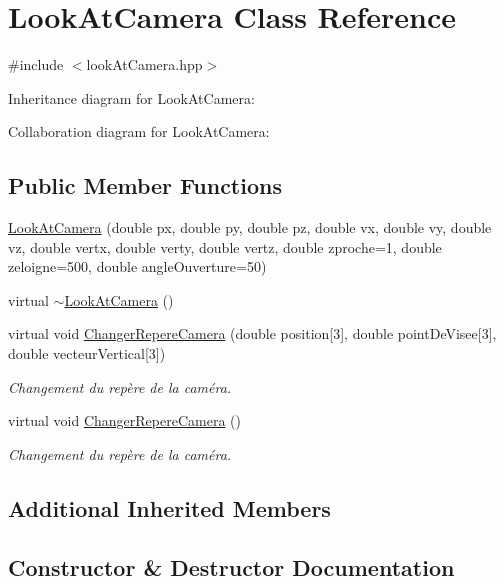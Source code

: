 \hypertarget{class_look_at_camera}{}\section{Look\+At\+Camera Class Reference}
\label{class_look_at_camera}


{\ttfamily \#include $<$look\+At\+Camera.\+hpp$>$}



Inheritance diagram for Look\+At\+Camera\+:


Collaboration diagram for Look\+At\+Camera\+:
\subsection*{Public Member Functions}
\begin{DoxyCompactItemize}
\item 
\hyperlink{class_look_at_camera_a14d523ff4ea3cc37abf726e2ffd981ec}{Look\+At\+Camera} (double px, double py, double pz, double vx, double vy, double vz, double vertx, double verty, double vertz, double zproche=1, double zeloigne=500, double angle\+Ouverture=50)
\item 
virtual \hyperlink{class_look_at_camera_a88d62e1f68d1ccf9dd3a80fd951e3632}{$\sim$\+Look\+At\+Camera} ()
\item 
virtual void \hyperlink{class_look_at_camera_a0904e7cb4cc17c9d8dd54d8a394eb9cc}{Changer\+Repere\+Camera} (double position\mbox{[}3\mbox{]}, double point\+De\+Visee\mbox{[}3\mbox{]}, double vecteur\+Vertical\mbox{[}3\mbox{]})
\begin{DoxyCompactList}\small\item\em Changement du repère de la caméra. \end{DoxyCompactList}\item 
virtual void \hyperlink{class_look_at_camera_ac8ff2cf45773bf8f27fa9972e1f48c5d}{Changer\+Repere\+Camera} ()
\begin{DoxyCompactList}\small\item\em Changement du repère de la caméra. \end{DoxyCompactList}\end{DoxyCompactItemize}
\subsection*{Additional Inherited Members}


\subsection{Constructor \& Destructor Documentation}
